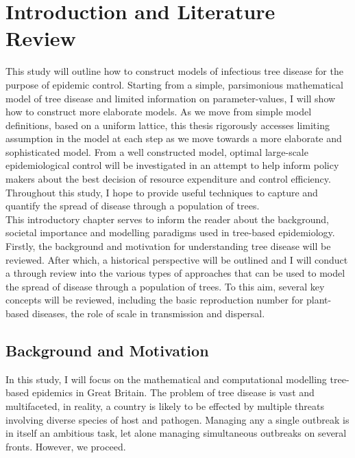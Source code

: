 \chapter{Introduction and Literature Review}

This study will outline how to construct models of infectious tree disease for the purpose of epidemic control. Starting from a simple, parsimonious mathematical model of tree disease and limited information on parameter-values, I will show how to construct more elaborate models. As we move from simple model definitions, based on a uniform lattice, this thesis rigorously accesses limiting assumption in the model at each step as we move towards a more elaborate and sophisticated model. From a well constructed model, optimal large-scale epidemiological control will be investigated in an attempt to help inform policy makers about the best decision of resource expenditure and control efficiency. Throughout this study, I hope to provide useful techniques to capture and quantify the spread of disease through a population of trees.\\

This introductory chapter serves to inform the reader about the background, societal importance and modelling paradigms used in tree-based epidemiology. Firstly, the background and motivation for understanding tree disease will be reviewed. After which, a historical perspective will be outlined and I will conduct a through review into the various types of approaches that can be used to model the spread of disease through a population of trees. To this aim, several key concepts will be reviewed, including the basic reproduction number for plant-based diseases, the role of scale in transmission and dispersal. \newpage

\section{Background and Motivation}

In this study, I will focus on the mathematical and computational modelling tree-based epidemics in Great Britain. The problem of tree disease is vast and multifaceted, in reality, a country is likely to be effected by multiple threats involving diverse species of host and pathogen. Managing any a single outbreak is in itself an ambitious task, let alone managing simultaneous outbreaks on several fronts. However, we proceed.\\

